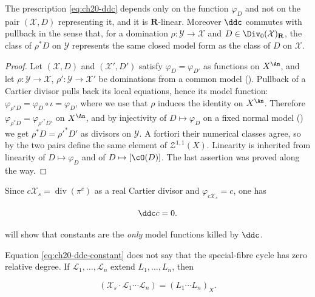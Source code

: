 \begin{lemma}
\label{lem:ch20-ddc-well-defined}
The prescription \eqref{eq:ch20-ddc} depends only on the function
\(\varphi_D\) and not on the pair \((\mathcal X,D)\) representing it, and it
is \(\mathbf R\)-linear.  Moreover \(\ddc\) commutes with pullback in the
sense that, for a domination \(\rho:\mathcal Y\to\mathcal X\) and
\(D\in\Div_0(\mathcal X)_{\mathbf R}\), the class of \(\rho^*D\) on
\(\mathcal Y\) represents the same closed model form as the class of \(D\)
on \(\mathcal X\).
\end{lemma}

\begin{proof}
Let \((\mathcal X,D)\) and \((\mathcal X',D')\) satisfy
\(\varphi_D=\varphi_{D'}\) as functions on \(X^{\An}\), and let
\(\rho:\mathcal Y\to\mathcal X\), \(\rho':\mathcal Y\to\mathcal X'\) be
dominations from a common model ().  Pullback
of a Cartier divisor pulls back its local equations, hence its model
function: \(\varphi_{\rho^*D}=\varphi_D\circ\iota=\varphi_D\), where we use
that \(\rho\) induces the identity on \(X^{\An}\).  Therefore
\(\varphi_{\rho^*D}=\varphi_{\rho'^*D'}\) on \(X^{\An}\), and by injectivity
of \(D\mapsto\varphi_D\) on a fixed normal model
() we get
\(\rho^*D=\rho'^*D'\) as divisors on \(\mathcal Y\).  A fortiori their
numerical classes agree, so by  the two
pairs define the same element of \(\mathcal Z^{1,1}(X)\).  Linearity is
inherited from linearity of \(D\mapsto\varphi_D\) and of
\(D\mapsto[\cO(D)]\).  The last assertion was proved along the way.
\end{proof}

Since \(c\mathcal X_s=\operatorname{div}(\pi^c)\) as
a real Cartier divisor and \(\varphi_{c\mathcal X_s}=c\), one has

\begin{equation}
\label{eq:ch20-ddc-constant}
                            \ddc c=0.
\end{equation}

 will show that constants are the \emph{only}
model functions killed by \(\ddc\).

Equation \eqref{eq:ch20-ddc-constant} does not say that the special-fibre
cycle has zero relative degree.  If
\(\mathcal L_1,\ldots,\mathcal L_n\) extend \(L_1,\ldots,L_n\), then

\begin{equation}
\label{eq:ch20-special-fibre-degree}
 (\mathcal X_s\cdot\mathcal L_1\cdots\mathcal L_n)
                  =(L_1\cdots L_n)_X.
\end{equation}

